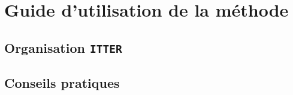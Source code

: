 \chapter{Guide d'utilisation de la méthode}
\label{chapter:5-GUIDE}

    \section{Organisation \texttt{ITTER}}
		\label{section:5.1-GUIDE-ITTER}
	
	
    \section{Conseils pratiques}
		\label{section:5.2-GUIDE-CONSEILS}
